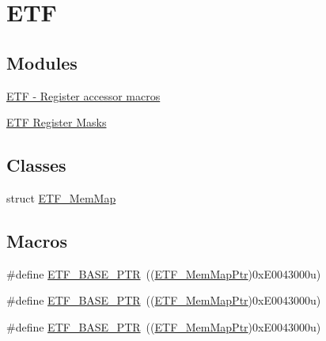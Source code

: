 \hypertarget{group___e_t_f___peripheral}{}\section{E\+TF}
\label{group___e_t_f___peripheral}
\subsection*{Modules}
\begin{DoxyCompactItemize}
\item 
\hyperlink{group___e_t_f___register___accessor___macros}{E\+T\+F -\/ Register accessor macros}
\item 
\hyperlink{group___e_t_f___register___masks}{E\+T\+F Register Masks}
\end{DoxyCompactItemize}
\subsection*{Classes}
\begin{DoxyCompactItemize}
\item 
struct \hyperlink{struct_e_t_f___mem_map}{E\+T\+F\+\_\+\+Mem\+Map}
\end{DoxyCompactItemize}
\subsection*{Macros}
\begin{DoxyCompactItemize}
\item 
\#define \hyperlink{group___e_t_f___peripheral_ga46da3f879a5311a0651d7908021daa5e}{E\+T\+F\+\_\+\+B\+A\+S\+E\+\_\+\+P\+TR}~((\hyperlink{group___e_t_f___peripheral_ga3b20bc884bec4b23870d47a4e2f9a118}{E\+T\+F\+\_\+\+Mem\+Map\+Ptr})0x\+E0043000u)
\item 
\#define \hyperlink{group___e_t_f___peripheral_ga46da3f879a5311a0651d7908021daa5e}{E\+T\+F\+\_\+\+B\+A\+S\+E\+\_\+\+P\+TR}~((\hyperlink{group___e_t_f___peripheral_ga3b20bc884bec4b23870d47a4e2f9a118}{E\+T\+F\+\_\+\+Mem\+Map\+Ptr})0x\+E0043000u)
\item 
\#define \hyperlink{group___e_t_f___peripheral_ga46da3f879a5311a0651d7908021daa5e}{E\+T\+F\+\_\+\+B\+A\+S\+E\+\_\+\+P\+TR}~((\hyperlink{group___e_t_f___peripheral_ga3b20bc884bec4b23870d47a4e2f9a118}{E\+T\+F\+\_\+\+Mem\+Map\+Ptr})0x\+E0043000u)
\end{DoxyCompactItemize}
